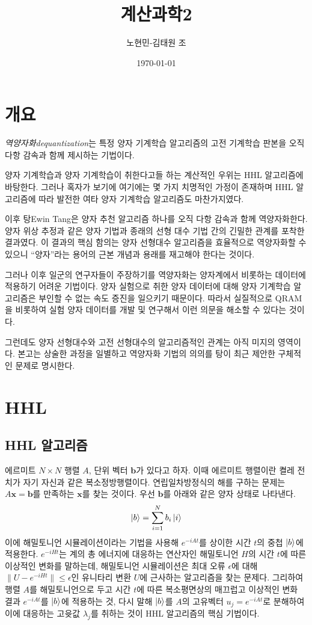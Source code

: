 \documentclass[a4paper,atbegshi,chapter,itemph,hidelinks]{oblivoir}
\title{계산과학2}
\author{노현민-김태원 조}
\date{\today}
\begin{document}
\maketitle\pagestyle{empty}\newpage
\tableofcontents
\chapter{개요}
\emph{역양자화\footnotesize dequantization}는 특정 양자 기계학습 알고리즘의
고전 기계학습 판본을 오직 다항 감속과 함께 제시하는 기법이다. 

양자 기계학습과 양자 기계학습이 취한다고들 하는 계산적인 우위는 HHL 알고리즘에
바탕한다. 그러나 혹자가 보기에 여기에는 몇 가지 치명적인 가정이 존재하며 HHL
알고리즘에 따라 발전한 여타 양자 기계학습 알고리즘도 마찬가지였다.

이후 탕{\tiny Ewin Tang}은 양자 추천 알고리즘 하나를 오직 다항 감속과 함께
역양자화한다. 양자 위상 추정과 같은 양자 기법과 종래의 선형 대수 기법 간의
긴밀한 관계를 포착한 결과였다. 이 결과의 핵심 함의는 양자 선형대수 알고리즘을
효율적으로 역양자화할 수 있으니 ``양자''라는 용어의 근본 개념과 용래를 재고해야
한다는 것이다. 

그러나 이후 일군의 연구자들이 주장하기를 역양자화는 양자계에서 비롯하는
데이터에 적용하기 어려운 기법이다. 양자 실험으로 취한 양자 데이터에 대해 양자
기계학습 알고리즘은 부인할 수 없는 속도 증진을 일으키기 때문이다. 따라서 
실질적으로 QRAM을 비롯하여 실험 양자 데이터를 개발 및 연구해서 이런 의문을 
해소할 수 있다는 것이다. 

그런데도 양자 선형대수와 고전 선형대수의 알고리즘적인 관계는 아직 미지의
영역이다. 본고는 상술한 과정을 일별하고 역양자화 기법의 의의를 탕이 최근
제안한 구체적인 문제로 명시한다. 
\chapter{HHL}
\section{HHL 알고리즘}
에르미트 $N\times N$ 행렬 $A$, 단위 벡터 $\pmb{b}$가 있다고 하자. 이때 에르미트
행렬이란 켤레 전치가 자기 자신과 같은 복소정방행렬이다. 연립일차방정식의
해를 구하는 문제는 $A\pmb{x}=\pmb{b}$를 만족하는 $\mathbf{x}$를 찾는 것이다. 우선
$\pmb{b}$를 아래와 같은 양자 상태로 나타낸다.
\[
  \ket{b} = \sum_{i=1}^N b_i\ket{i}
\]
이에 해밀토니언 시뮬레이션이라는 기법을 사용해 $e^{-iAt}$를 상이한 시간 $t$의 중첩
$\ket{b}$에 적용한다. $e^{-iHt}$는 계의 총 에너지에 대응하는 연산자인 해밀토니언
$H$의 시간 $t$에 따른 이상적인 변화를 말하는데, 해밀토니언 시뮬레이션은 최대
오류 $\epsilon$에 대해 $\|U-e^{-iHt}\|\leq\epsilon$인 유니타리 변환 $U$에 
근사하는 알고리즘을 찾는 문제다. 그리하여 행렬 $A$를 해밀토니언으로 두고
시간 $t$에 따른 복소평면상의 매끄럽고 이상적인 변화 결과 $e^{-iAt}$를 $\ket{b}$에
적용하는 것, 다시 말해 $\ket{b}$를 $A$의 고유벡터 $u_j=e^{-iAt}$로 분해하여 이에
대응하는 고윳값 $\lambda_j$를 취하는 것이 HHL 알고리즘의 핵심 기법이다.
\end{document}
